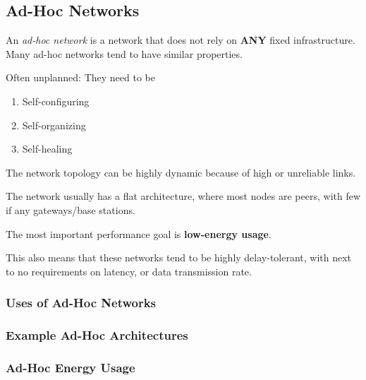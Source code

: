 \subsection{Ad-Hoc Networks}\label{subsec:Ad_Hoc_Networks}
\begin{definition}\label{def:Ad_Hoc_Network}
  An \emph{ad-hoc network} is a network that does not rely on \textbf{ANY} fixed infrastructure.
  Many ad-hoc networks tend to have similar properties.
  \begin{propertylist}
  \item Often unplanned: They need to be
    \begin{enumerate}[noitemsep]
    \item Self-configuring
    \item Self-organizing
    \item Self-healing
    \end{enumerate}

  \item The network topology can be highly dynamic because of high  or unreliable links.
  \item The network usually has a flat architecture, where most nodes are peers, with few if any gateways/base stations.
  \item The most important performance goal is \textbf{low-energy usage}.
  \end{propertylist}

  This also means that these networks tend to be highly delay-tolerant, with next to no requirements on latency, or data transmission rate.
\end{definition}

\subsubsection{Uses of Ad-Hoc Networks}\label{subsubsec:Uses_Ad_Hoc_Network}
\subsubsection{Example Ad-Hoc Architectures}\label{subsubsec:Ad_Hoc_Architectures}
\subsubsection{Ad-Hoc Energy Usage}\label{subsubsec:Ad_Hoc_Architectures}

